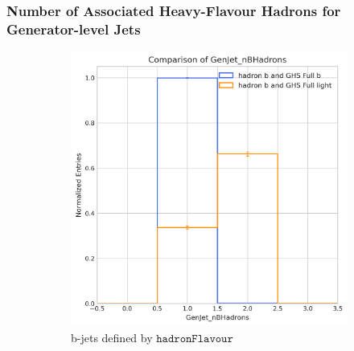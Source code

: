 \documentclass[10pt,twocolumn]{article}
\newcommand*{\hadFlav}{\texttt{hadronFlavour}}
\begin{document}
\subsubsection{Number of Associated Heavy-Flavour Hadrons for Generator-level Jets}
\label{sec:vali-vars-nhad}


\begin{figure}[!htbp]
    \centering
    \begin{subfigure}[t]{0.48\textwidth}
        \centering
        \includegraphics[width=\textwidth]{images/compare_GenJet_nBHadrons_GHSFull_light_vs_b_filter_hadronFlavour_5.png}
        \caption{b-jets defined by $\hadFlav$}
        \label{fig:GenJet_nBHad_full_b_hadron_b}
    \end{subfigure}
    \hfill
    \begin{subfigure}[t]{0.48\textwidth}
        \centering

\end{subfigure}
\end{figure}
\end{document}
